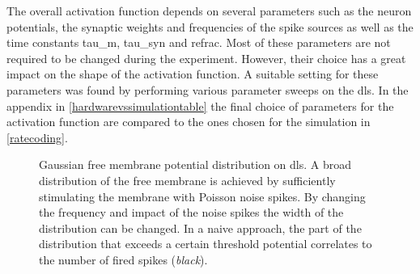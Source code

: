 The overall activation function depends on several parameters such as the neuron potentials, the synaptic weights and frequencies of the spike sources as well as the time constants \gls{tau_m}, \gls{tau_syn} and \gls{refrac}. Most of these parameters are not required to be changed during the experiment. However, their choice has a great impact on the shape of the activation function. A suitable setting for these parameters was found by performing various parameter sweeps on the \gls{dls}. In the appendix in \cref{hardwarevssimulationtable} the final choice of parameters for the activation function are compared to the ones chosen for the simulation in \cref{ratecoding}.
%
\begin{figure}
	\begin{center}
		
	\end{center}
	\caption[Gaussian free membrane potential distribution on \gls{dls}.]{Gaussian free membrane potential distribution on \gls{dls}. A broad distribution of the free membrane is achieved by sufficiently stimulating the membrane with Poisson noise spikes. By changing the frequency and impact of the noise spikes the width of the distribution can be changed. In a naive approach, the part of the distribution that exceeds a certain threshold potential correlates to the number of fired spikes (\textit{black}).}
	\label{vleak_w_noise}
\end{figure}


